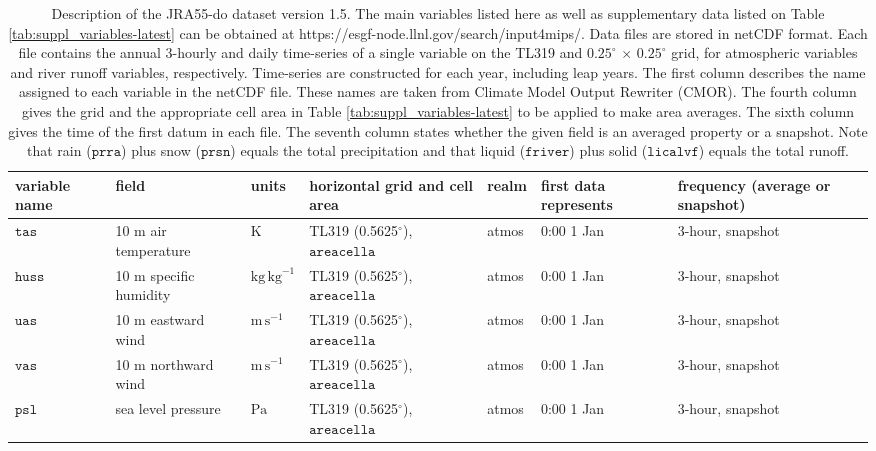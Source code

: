 \documentclass[dvipdfmx]{elsarticle_mod}
\begin{document}
\begin{table}[h]
\centering
\caption{Description of the JRA55-do dataset version 1.5. The main variables listed here as well as supplementary data listed on Table \ref{tab:suppl_variables-latest} can be obtained at https://esgf-node.llnl.gov/search/input4mips/. Data files are stored in netCDF format. Each file contains the annual 3-hourly and daily time-series of a single variable on the TL319 and $0.25^{\circ}\,\times\,0.25^{\circ}$ grid, for atmospheric variables and river runoff variables, respectively. Time-series are constructed for each year, including leap years. The first column describes the name assigned to each variable in the netCDF file. These names are taken from Climate Model Output Rewriter (CMOR). The fourth column gives the grid and the appropriate cell area in Table \ref{tab:suppl_variables-latest} to be applied to make area averages. The sixth column gives the time of the first datum in each file. The seventh column states whether the given field is an averaged property or a snapshot. Note that rain ($\texttt{prra}$) plus snow ($\texttt{prsn}$) equals the total precipitation and that liquid ($\texttt{friver}$) plus solid ($\texttt{licalvf}$) equals the total runoff. \label{tab:main_variables-latest}}
\begin{threeparttable}
\begin{tabular*}{17.5cm}{p{1.4cm}|p{3.3cm}|p{1.6cm}|p{2.5cm}|p{1.4cm}|p{1.5cm}|p{2.8cm}}
\hline
variable name & field & units & horizontal grid and cell area & realm & first data represents & frequency (average or snapshot) \\ \hline \hline
$\texttt{tas}$  &  10 m air temperature   & $\mathrm{K}$ & TL319 (0.5625$^{\circ}$), $\texttt{areacella}$ & atmos & 0:00 1 Jan & 3-hour, snapshot \\ \hline
$\texttt{huss}$ &  10 m specific humidity & $\mathrm{kg}\,\mathrm{kg}^{-1}$ & TL319 (0.5625$^{\circ}$), $\texttt{areacella}$ & atmos & 0:00 1 Jan & 3-hour, snapshot \\ \hline
$\texttt{uas}$  &  10 m eastward wind     & $\mathrm{m}\,\mathrm{s}^{-1}$ & TL319 (0.5625$^{\circ}$), $\texttt{areacella}$ & atmos & 0:00 1 Jan & 3-hour, snapshot \\ \hline
$\texttt{vas}$  &  10 m northward wind    & $\mathrm{m}\,\mathrm{s}^{-1}$ & TL319 (0.5625$^{\circ}$), $\texttt{areacella}$ & atmos & 0:00 1 Jan & 3-hour, snapshot \\ \hline
$\texttt{psl}$  &  sea level pressure     & $\mathrm{Pa}$ & TL319 (0.5625$^{\circ}$), $\texttt{areacella}$ & atmos & 0:00 1 Jan & 3-hour, snapshot \\ \hline

\end{tabular*}
\end{threeparttable}
\end{table}
\end{document}
